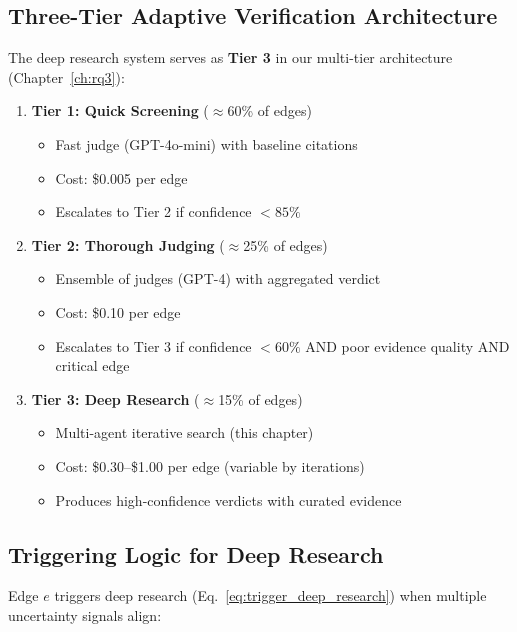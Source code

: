 \subsection{Three-Tier Adaptive Verification Architecture}

The deep research system serves as \textbf{Tier 3} in our multi-tier architecture (Chapter~\ref{ch:rq3}):

\begin{enumerate}
    \item \textbf{Tier 1: Quick Screening} ($\approx$60\% of edges)
    \begin{itemize}
        \item Fast judge (GPT-4o-mini) with baseline citations
        \item Cost: \$0.005 per edge
        \item Escalates to Tier 2 if confidence $< 85\%$
    \end{itemize}
    
    \item \textbf{Tier 2: Thorough Judging} ($\approx$25\% of edges)
    \begin{itemize}
        \item Ensemble of judges (GPT-4) with aggregated verdict
        \item Cost: \$0.10 per edge
        \item Escalates to Tier 3 if confidence $< 60\%$ AND poor evidence quality AND critical edge
    \end{itemize}
    
    \item \textbf{Tier 3: Deep Research} ($\approx$15\% of edges)
    \begin{itemize}
        \item Multi-agent iterative search (this chapter)
        \item Cost: \$0.30--\$1.00 per edge (variable by iterations)
        \item Produces high-confidence verdicts with curated evidence
    \end{itemize}
\end{enumerate}

\subsection{Triggering Logic for Deep Research}

Edge $e$ triggers deep research (Eq.~\ref{eq:trigger_deep_research}) when multiple uncertainty signals align:

